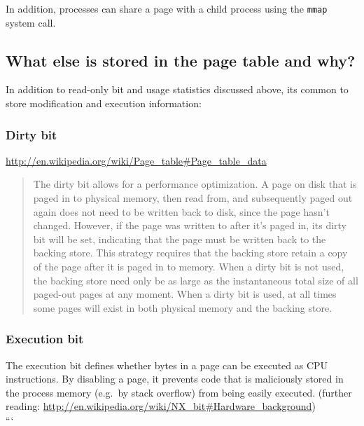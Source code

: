 In addition, processes can share a page with a child process using the
\texttt{mmap} system call.

\subsection{What else is stored in the page table and
why?}\label{what-else-is-stored-in-the-page-table-and-why}

In addition to read-only bit and usage statistics discussed above, its
common to store modification and execution information:

\subsubsection{Dirty bit}\label{dirty-bit}

\url{http://en.wikipedia.org/wiki/Page_table\#Page_table_data}

\begin{quote}
The dirty bit allows for a performance optimization. A page on disk that
is paged in to physical memory, then read from, and subsequently paged
out again does not need to be written back to disk, since the page
hasn't changed. However, if the page was written to after it's paged in,
its dirty bit will be set, indicating that the page must be written back
to the backing store. This strategy requires that the backing store
retain a copy of the page after it is paged in to memory. When a dirty
bit is not used, the backing store need only be as large as the
instantaneous total size of all paged-out pages at any moment. When a
dirty bit is used, at all times some pages will exist in both physical
memory and the backing store.
\end{quote}

\subsubsection{Execution bit}\label{execution-bit}

The execution bit defines whether bytes in a page can be executed as CPU
instructions. By disabling a page, it prevents code that is maliciously
stored in the process memory (e.g.~by stack overflow) from being easily
executed. (further reading:
\url{http://en.wikipedia.org/wiki/NX_bit\#Hardware_background})\\```
